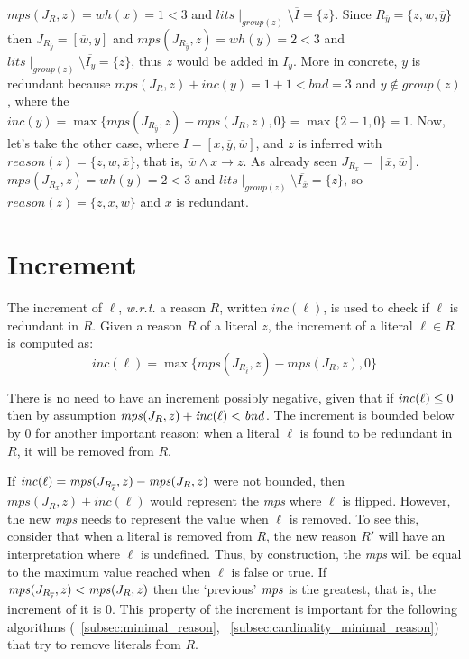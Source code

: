 $mps(J_R,z) = \mathit{wh}(x) = 1 < 3$ and $lits\mid_{group(z)} \setminus \overline{I} = \{z\}$.
Since $R_{\overline{y}} = \{z, w, \overline{y}\}$ then $J_{R_{\overline{y}}} = [\overline{w},y]$ and 
$mps(J_{R_{\overline{y}}},z) = \mathit{wh}(y) = 2 < 3$ and
$lits\mid_{group(z)} \setminus \overline{I_y} = \{z\}$, thus $z$ would be added in $I_y$.
More in concrete, $y$ is redundant because $mps(J_R,z) + \mathit{inc}(y) = 1 + 1 < \mathit{bnd} = 3$ and
$y \not\in group(z)$, where the $\mathit{inc}(y) = \max\{mps(J_{R_{\overline{y}}},z) - mps(J_R,z),0\} = \max\{2 - 1,0\} = 1$.
Now, let's take the other case, where $I = [x, \overline{y}, \overline{w}]$, 
and $z$ is inferred with $\mathit{reason}(z) = \{z, w, \overline{x}\}$, that is, 
$\overline{w} \land  x \rightarrow z$.
As already seen $J_{R_{x}}=[\overline{x}, \overline{w}]$.\\
$mps(J_{R_{x}},z) = \mathit{wh}(y) = 2 < 3$ and
$lits\mid_{group(z)} \setminus \overline{I_{\overline{x}}} = \{z\}$, 
so $\mathit{reason}(z)=\{z, x, w\}$
and $\overline{x}$ is redundant.

\section{Increment}
\label{sec:increment}

The increment of $\ell$, \textit{w.r.t.} a reason $R$, written $\mathit{inc}(\ell)$, is used to check 
if $\ell$ is redundant in $R$.
Given a reason $R$ of a literal $z$, the increment of a literal $\ell \in R$ is computed as:
$$\mathit{inc}(\ell) = \max\{mps(J_{R_{\overline{\ell}}},z) - mps(J_R,z),0\}$$

There is no need to have an increment possibly negative, given that if $\mathit{inc}(\ell) \le 0$
then by assumption $\mathit{mps}(J_R,z) + \mathit{inc}(\ell) < \mathit{bnd}$.
The increment is bounded below by 0 for another important reason: 
when a literal \(\ell\) is found to be redundant in \(R\), it will be removed from \(R\).

If \(\mathit{inc}(\ell) = \mathit{mps}(J_{R_{\overline{\ell}}}, z) - \mathit{mps}(J_R,z)\) were not bounded, 
then \(\mathit{mps}(J_R, z) + \mathit{inc}(\ell)\) would represent the \textit{mps} where \(\ell\) is flipped.
However, the new \textit{mps} needs to represent the value when \(\ell\) is removed.
To see this, consider that when a literal is removed from \(R\), the new reason \(R'\) 
will have an interpretation where \(\ell\) is undefined. Thus, by construction, the \textit{mps}
will be equal to the maximum value reached when \(\ell\) is false or true.
If $\mathit{mps}(J_{R_{\overline{\ell}}}, z) < \mathit{mps}(J_R,z)$
then the `previous' $\mathit{mps}$ is the greatest, that is, the increment of it is $0$.
This property of the increment is important for the following algorithms (~\ref{subsec:minimal_reason},
~\ref{subsec:cardinality_minimal_reason}) that try
to remove literals from \(R\).

